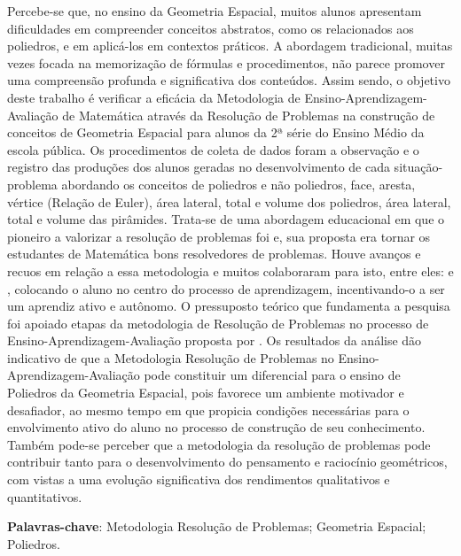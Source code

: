 
\setlength{\absparsep}{18pt} %
\begin{resumo}

  Percebe-se que, no ensino da Geometria Espacial, muitos alunos apresentam dificuldades em compreender conceitos abstratos, como os relacionados aos poliedros, e em aplicá-los em contextos práticos. A abordagem tradicional, muitas vezes focada na memorização de fórmulas e procedimentos, não parece promover uma compreensão profunda e significativa dos conteúdos. Assim sendo, o objetivo deste trabalho é verificar a eficácia da Metodologia de Ensino-Aprendizagem-Avaliação de Matemática através da Resolução de Problemas na construção de conceitos de Geometria Espacial para alunos da 2ª série do Ensino Médio da escola pública. Os procedimentos de coleta de dados foram a observação e o registro das produções dos alunos geradas no desenvolvimento de cada situação-problema abordando os conceitos de poliedros e não poliedros, face, aresta, vértice (Relação de Euler), área lateral, total e volume dos poliedros, área lateral, total e volume das pirâmides. Trata-se de uma abordagem educacional em que o pioneiro a valorizar a resolução de problemas foi  e, sua proposta era tornar os estudantes de Matemática bons resolvedores de problemas. Houve avanços e recuos em relação a essa metodologia e muitos colaboraram para isto, entre eles:  e , colocando o aluno no centro do processo de aprendizagem, incentivando-o a ser um aprendiz ativo e autônomo. O pressuposto teórico que fundamenta a pesquisa foi apoiado etapas da metodologia de Resolução de Problemas no processo de Ensino-Aprendizagem-Avaliação proposta por . Os resultados da análise dão indicativo de que a Metodologia Resolução de Problemas no Ensino-Aprendizagem-Avaliação pode constituir um diferencial para o ensino de Poliedros da Geometria Espacial, pois favorece um ambiente motivador e desafiador, ao mesmo tempo em que propicia condições necessárias para o envolvimento ativo do aluno no processo de construção de seu conhecimento. Também pode-se perceber que a metodologia da resolução de problemas pode contribuir tanto para o desenvolvimento do pensamento e raciocínio geométricos, com vistas a uma evolução significativa dos rendimentos qualitativos e quantitativos.

  \textbf{Palavras-chave}: Metodologia Resolução de Problemas; Geometria Espacial; Poliedros.

\end{resumo}
